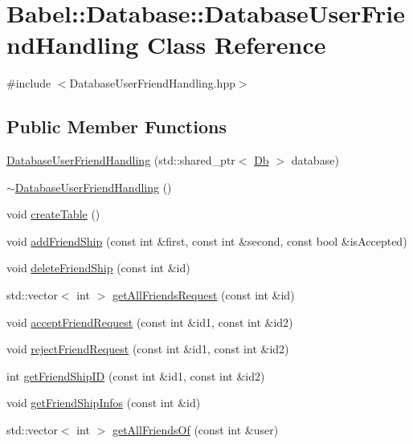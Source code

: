 \hypertarget{classBabel_1_1Database_1_1DatabaseUserFriendHandling}{}\section{Babel\+:\+:Database\+:\+:Database\+User\+Friend\+Handling Class Reference}
\label{classBabel_1_1Database_1_1DatabaseUserFriendHandling}


{\ttfamily \#include $<$Database\+User\+Friend\+Handling.\+hpp$>$}

\subsection*{Public Member Functions}
\begin{DoxyCompactItemize}
\item 
\hyperlink{classBabel_1_1Database_1_1DatabaseUserFriendHandling_ae3b7b606b14c0909cd910cd40072aefd}{Database\+User\+Friend\+Handling} (std\+::shared\+\_\+ptr$<$ \hyperlink{classBabel_1_1Database_1_1Db}{Db} $>$ database)
\item 
\hyperlink{classBabel_1_1Database_1_1DatabaseUserFriendHandling_afd0185ac08caed7694b5c05196882998}{$\sim$\+Database\+User\+Friend\+Handling} ()
\item 
void \hyperlink{classBabel_1_1Database_1_1DatabaseUserFriendHandling_a6586290bbfe7dfe6906f05277ee7be2b}{create\+Table} ()
\item 
void \hyperlink{classBabel_1_1Database_1_1DatabaseUserFriendHandling_a1c2ac28c5b7280b8729b69b17996a056}{add\+Friend\+Ship} (const int \&first, const int \&second, const bool \&is\+Accepted)
\item 
void \hyperlink{classBabel_1_1Database_1_1DatabaseUserFriendHandling_a3336a26154efbdbbd52a642121702295}{delete\+Friend\+Ship} (const int \&id)
\item 
std\+::vector$<$ int $>$ \hyperlink{classBabel_1_1Database_1_1DatabaseUserFriendHandling_af7cc5f7f383fb5750149f1a20f53bebf}{get\+All\+Friends\+Request} (const int \&id)
\item 
void \hyperlink{classBabel_1_1Database_1_1DatabaseUserFriendHandling_adac3fe3ddc5369d9d285164504db0473}{accept\+Friend\+Request} (const int \&id1, const int \&id2)
\item 
void \hyperlink{classBabel_1_1Database_1_1DatabaseUserFriendHandling_a8ea2097e590e629a0a1aea31c1260600}{reject\+Friend\+Request} (const int \&id1, const int \&id2)
\item 
int \hyperlink{classBabel_1_1Database_1_1DatabaseUserFriendHandling_a5447e835948344c871e7f47fb66f26c0}{get\+Friend\+Ship\+ID} (const int \&id1, const int \&id2)
\item 
void \hyperlink{classBabel_1_1Database_1_1DatabaseUserFriendHandling_a2bed1d6913f15db98bc4ebadf0135310}{get\+Friend\+Ship\+Infos} (const int \&id)
\item 
std\+::vector$<$ int $>$ \hyperlink{classBabel_1_1Database_1_1DatabaseUserFriendHandling_ab891f2703d81522227d57dce7f69100b}{get\+All\+Friends\+Of} (const int \&user)
\end{DoxyCompactItemize}


